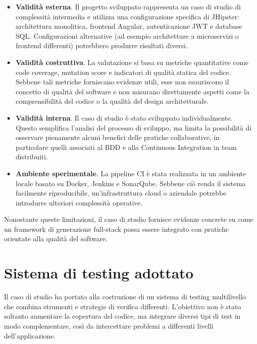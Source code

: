 \begin{itemize}
	\item \textbf{Validità esterna}.  
	Il progetto sviluppato rappresenta un caso di studio di complessità intermedia e utilizza una configurazione specifica di JHipster: architettura monolitica, frontend Angular, autenticazione JWT e database SQL. Configurazioni alternative (ad esempio architetture a microservizi o frontend differenti) potrebbero produrre risultati diversi.
	
	\item \textbf{Validità costruttiva}.  
	La valutazione si basa su metriche quantitative come code coverage, mutation score e indicatori di qualità statica del codice. Sebbene tali metriche forniscano evidenze utili, esse non esauriscono il concetto di qualità del software e non misurano direttamente aspetti come la comprensibilità del codice o la qualità del design architetturale.
	
	\item \textbf{Validità interna}.  
	Il caso di studio è stato sviluppato individualmente. Questo semplifica l’analisi del processo di sviluppo, ma limita la possibilità di osservare pienamente alcuni benefici delle pratiche collaborative, in particolare quelli associati al BDD e alla Continuous Integration in team distribuiti.
	
	\item \textbf{Ambiente sperimentale}.  
	La pipeline CI è stata realizzata in un ambiente locale basato su Docker, Jenkins e SonarQube. Sebbene ciò renda il sistema facilmente riproducibile, un’infrastruttura cloud o aziendale potrebbe introdurre ulteriori complessità operative.
	
\end{itemize}

Nonostante queste limitazioni, il caso di studio fornisce evidenze concrete su come un framework di generazione full-stack possa essere integrato con pratiche orientate alla qualità del software.

\section{Sistema di testing adottato}
\label{sec:evaluation-testing-system}

Il caso di studio ha portato alla costruzione di un sistema di testing multilivello che combina strumenti e strategie di verifica differenti. L’obiettivo non è stato soltanto aumentare la copertura del codice, ma integrare diversi tipi di test in modo complementare, così da intercettare problemi a differenti livelli dell’applicazione.

